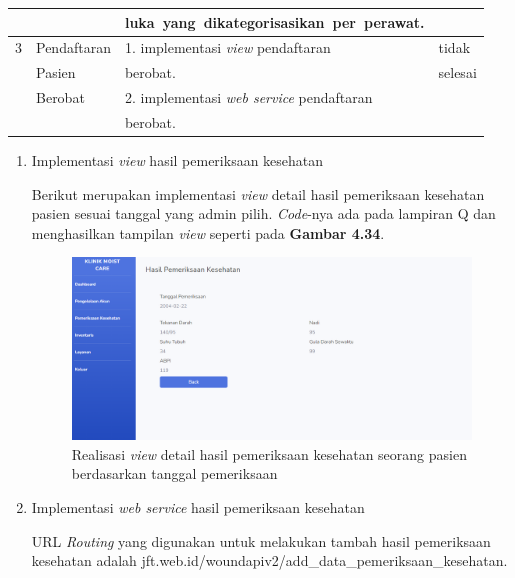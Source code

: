 \begin{table}[H]
\begin{tabular}{|c|l|l|l|}
		& 
		& 
		luka yang dikategorisasikan per perawat.&
		\\
		\hline
		
		3 & 
		Pendaftaran & 
		1. implementasi \emph{view} pendaftaran&
		tidak\\
		
		& 
		Pasien& 
		berobat.&
		selesai\\
		
		& 
		Berobat& 
		2. implementasi \emph{web service} pendaftaran&\\
		
		& 
		& 
		berobat.&\\
		\hline

	\end{tabular}
\end{table}

\begin{enumerate}
	\item Implementasi \emph{view} hasil pemeriksaan kesehatan
	
	Berikut merupakan implementasi \emph{view} detail hasil pemeriksaan kesehatan pasien sesuai tanggal yang admin pilih. \emph{Code}-nya ada pada lampiran Q dan menghasilkan tampilan \emph{view} seperti pada \textbf{Gambar 4.34}.
	
	\begin{figure}[H]
		\centering
		\includegraphics[width=14cm]{gambar/detail_hasil_pemeriksaan_kesehatan_view.png}
		\caption{Realisasi \emph{view} detail hasil pemeriksaan kesehatan seorang pasien berdasarkan tanggal pemeriksaan} 
		\label{Gambar:usecaseadminjurnalpertama}
	\end{figure}
	
	\item Implementasi \emph{web service} hasil pemeriksaan kesehatan
	
	URL \emph{Routing} yang digunakan untuk melakukan tambah hasil pemeriksaan kesehatan adalah jft.web.id/woundapiv2/add\_data\_pemeriksaan\_kesehatan.
	

\end{enumerate}
